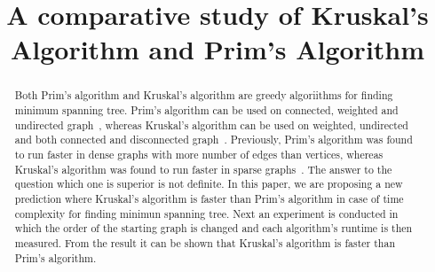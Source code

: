 \documentclass[conference,column]{IEEEtran}
\begin{document}
\title{A comparative study of Kruskal's Algorithm and Prim's Algorithm}

\author{
}


%








\maketitle

\begin{abstract}
Both Prim's algorithm and Kruskal's algorithm are greedy algoriithms for finding minimum spanning tree. Prim's algorithm can be used on connected, weighted and undirected graph~\cite{primwiki}, whereas Kruskal's algorithm can be used on weighted, undirected and both connected and disconnected graph~\cite{kruskalwiki}. Previously, Prim's algorithm was found to run faster in dense graphs with more number of edges than vertices, whereas Kruskal's algorithm was found to run faster in sparse graphs~\cite{dif}. The answer to the question which one is superior is not definite. In this paper, we are proposing a new prediction where Kruskal's algorithm is faster than Prim's algorithm in case of time complexity for finding minimun spanning tree. Next an experiment is conducted in which the order of the starting graph is changed and each algorithm's runtime is then measured. From the result it can be shown that Kruskal's algorithm is faster than Prim's algorithm.
\end{abstract}
\end{document}

